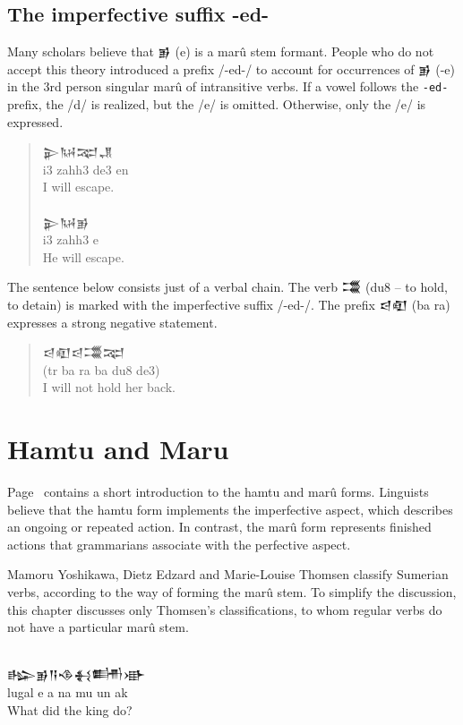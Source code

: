 \documentclass[a4paper,12pt]{book}
\newcommand{\fcn}{\setmainfont{Akkadian.otf}}
\newcommand{\fcm}{\large\setmainfont{Akkadian.otf}}
\begin{document}
\section{The imperfective suffix -ed-}
Many scholars believe that {\fcn 𒂊} (e)
is a marû stem formant. People who do not accept
this theory introduced a prefix /-ed-/ to
account for occurrences of {\fcn 𒂊}  (-e)
in the 3rd person
singular marû of intransitive verbs.
If a vowel follows the \verb|-ed-| prefix,
the /d/ is realized, but
the  /e/ is omitted.
Otherwise, only the /e/ is expressed.\\
\begin{quotation}
\noindent
{\fcm 𒉌𒀄𒉈𒂗}\\
i3 zahh3 de3 en\\
I will escape.\\

\verb||\\
{\fcm 𒉌𒀄𒂊}\\
i3 zahh3 e\\
He will escape.
\end{quotation}

The sentence below consists just of a verbal chain.
The verb {\fcn 𒂃}  (du8 -- to hold, to detain)
is marked with the imperfective suffix /-ed-/.
The prefix {\fcn 𒁀𒊏}  (ba ra) expresses
a strong negative statement.
\begin{quote}
  {\fcm 𒁀𒊏𒁀𒂃𒉈}\\
  (tr ba ra ba du8 de3)\\
  I will not hold her back.
\end{quote}

\chapter{Hamtu and Maru}
Page~\pageref{hamtu-maru} contains
a short introduction to the hamtu
and marû forms. Linguists believe
that the hamtu form implements the
imperfective aspect, which describes
an ongoing or repeated action.
In contrast, the marû form represents
finished actions that grammarians associate
with the perfective aspect.

Mamoru Yoshikawa, Dietz Edzard
and Marie-Louise Thomsen classify
Sumerian verbs, according to the
way of forming the marû stem.
To simplify the discussion, this
chapter discusses only Thomsen's
classifications, to whom
regular verbs do not
have a particular marû stem.

\verb||\\
{\fcm 𒈗𒂊𒀀𒈾𒈬𒌦𒀝}\\
lugal e a na mu un ak\\
What did the king do?
\end{document}
